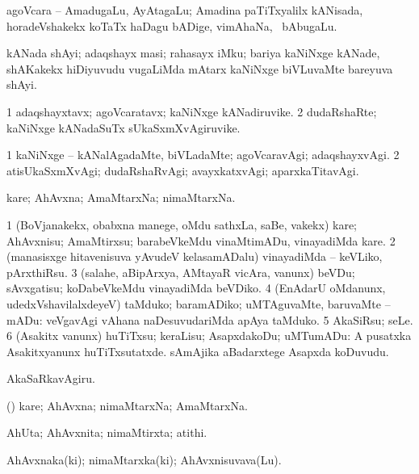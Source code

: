 \bentry
{}
\gl{\nA}
\bmng
agoVcara -- AmadugaLu, AyAtagaLu; Amadina paTiTxyalilx kANisada, horadeVshakekx koTaTx haDagu bADige, vimAhaNa, \mo\ bAbugaLu. 
\emng
\eentry

\bentry
{}
\gl{\nA}
\bmng
kANada shAyi; adaqshayx masi; rahasayx iMku; bariya kaNiNxge kANade, shAKakekx hiDiyuvudu \mo vugaLiMda mAtarx kaNiNxge biVLuvaMte bareyuva shAyi. 
\emng
\eentry

\bentry
{}
\gl{\nA}
\bmng
\bnum
\num{1} adaqshayxtavx; agoVcaratavx; kaNiNxge kANadiruvike. 
\num{2} dudaRshaRte; kaNiNxge kANadaSuTx sUkaSxmXvAgiruvike. 
\enum
\emng
\eentry

\bentry
{}
\gl{\kirxvi}
\bmng
\bnum
\num{1} kaNiNxge -- kANalAgadaMte, biVLadaMte; agoVcaravAgi; adaqshayxvAgi. 
\num{2} atisUkaSxmXvAgi; dudaRshaRvAgi; avayxkatxvAgi; aparxkaTitavAgi. 
\enum
\emng
\eentry

\bentry
{}
\gl{\nA}
\bmng
kare; AhAvxna; AmaMtarxNa; nimaMtarxNa. 
\emng
\eentry

\bentry
{}
\gl{\sakirx}
\bmng
\bnum
\num{1} (BoVjanakekx, obabxna manege, oMdu sathxLa, saBe, \mo vakekx) kare; AhAvxnisu; AmaMtirxsu; barabeVkeMdu vinaMtimADu, vinayadiMda kare. 
\num{2} (manasisxge hitavenisuva yAvudeV kelasamADalu) vinayadiMda -- keVLiko, pArxthiRsu. 
\num{3} (salahe, aBipArxya, AMtayaR vicAra, \mo vanunx) beVDu; sAvxgatisu; koDabeVkeMdu vinayadiMda beVDiko. 
\num{4} (EnAdarU oMdanunx, udedxVshavilalxdeyeV) taMduko; baramADiko; uMTAguvaMte, baruvaMte -- mADu:  veVgavAgi vAhana naDesuvudariMda apAya taMduko. 
\num{5} AkaSiRsu; seLe. 
\num{6} (Asakitx \mo vanunx) huTiTxsu; keraLisu; AsapxdakoDu; uMTumADu:  A pusatxka Asakitxyanunx huTiTxsutatxde.  sAmAjika aBadarxtege Asapxda koDuvudu. 
\enum
\emng

\noindent 
\gl{\akirx}
\bmng
AkaSaRkavAgiru. 
\emng
\eentry

\bentry
{}
\gl{\nA}
\bmng
(\AmA) kare; AhAvxna; nimaMtarxNa; AmaMtarxNa. 
\emng
\eentry

\bentry
{}
\gl{\nA}
\bmng
AhUta; AhAvxnita; nimaMtirxta; atithi. 
\emng
\eentry

\bentry
{}
\gl{\nA}
\bmng
AhAvxnaka(ki); nimaMtarxka(ki); AhAvxnisuvava(Lu). 
\emng
\eentry

